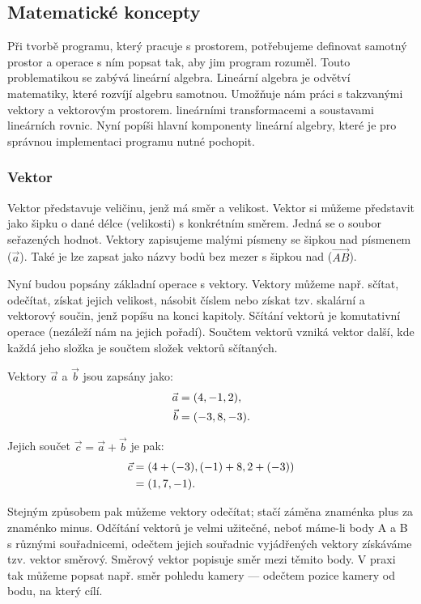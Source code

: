 \documentclass[12pt]{article}
\begin{document}
\subsection{Matematické koncepty}

Při tvorbě programu, který pracuje s prostorem, potřebujeme definovat samotný prostor a operace s ním popsat tak, aby jim program rozuměl. Touto problematikou se zabývá lineární algebra. Lineární algebra je odvětví matematiky, které rozvíjí algebru samotnou. Umožňuje nám práci s takzvanými vektory a vektorovým prostorem. lineárními transformacemi a soustavami lineárních rovnic. \cite{linear_algebra} Nyní popíši hlavní komponenty lineární algebry, které je pro správnou implementaci programu nutné pochopit.

\subsubsection{Vektor}

Vektor představuje veličinu, jenž má směr a velikost. Vektor si můžeme představit jako šipku o dané délce (velikosti) s konkrétním směrem. Jedná se o soubor seřazených hodnot. Vektory zapisujeme malými písmeny se šipkou nad písmenem ($\vec{a}$). Také je lze zapsat jako názvy bodů bez mezer s šipkou nad ($\vec{AB}$). \cite{vector}

Nyní budou popsány základní operace s vektory. Vektory můžeme např. sčítat, odečítat, získat jejich velikost, násobit číslem nebo získat tzv. skalární a vektorový součin, jenž popíšu na konci kapitoly. Sčítání vektorů je komutativní operace (nezáleží nám na jejich pořadí). Součtem vektorů vzniká vektor další, kde každá jeho složka je součtem složek vektorů sčítaných.

Vektory $\vec{a}$ a $\vec{b}$ jsou zapsány jako:
\begin{align}
    \vec{a} &= (4, -1, 2), \notag \\
    \vec{b} &= (-3, 8, -3).
\end{align}

Jejich součet $\vec{c} = \vec{a} + \vec{b}$ je pak:
\begin{align}
    \vec{c} &= (4 + (-3), (-1) + 8, 2 + (-3)) \notag \\
      &= (1, 7, -1).
\end{align}

\pagebreak

Stejným způsobem pak můžeme vektory odečítat; stačí záměna znaménka plus za znaménko minus. Odčítání vektorů je velmi užitečné, neboť máme-li body A a B s různými souřadnicemi, odečtem jejich souřadnic vyjádřených vektory získáváme tzv. vektor směrový. Směrový vektor popisuje směr mezi těmito body. V praxi tak můžeme popsat např. směr pohledu kamery — odečtem pozice kamery od bodu, na který cílí.
\end{document}
